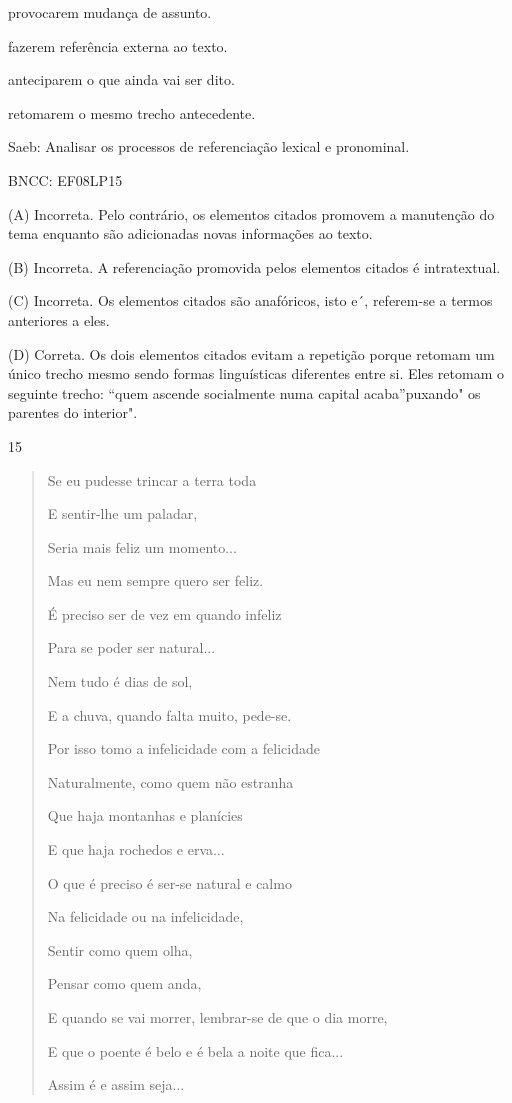 \begin{escolha}
\item provocarem mudança de assunto.

\item fazerem referência externa ao texto.

\item anteciparem o que ainda vai ser dito.

\item retomarem o mesmo trecho antecedente.
\end{escolha}

Saeb: Analisar os processos de referenciação lexical e pronominal.

BNCC: EF08LP15

(A) Incorreta. Pelo contrário, os elementos citados promovem a
manutenção do tema enquanto são adicionadas novas informações ao texto.

(B) Incorreta. A referenciação promovida pelos elementos citados é
intratextual.

(C) Incorreta. Os elementos citados são anafóricos, isto e´, referem-se
a termos anteriores a eles.

(D) Correta. Os dois elementos citados evitam a repetição porque retomam
um único trecho mesmo sendo formas linguísticas diferentes entre si.
Eles retomam o seguinte trecho: ``quem ascende socialmente numa capital
acaba''puxando" os parentes do interior".

\num{15}

\begin{quote}
Se eu pudesse trincar a terra toda

E sentir-lhe um paladar,

Seria mais feliz um momento...

Mas eu nem sempre quero ser feliz.

É preciso ser de vez em quando infeliz

Para se poder ser natural...

Nem tudo é dias de sol,

E a chuva, quando falta muito, pede-se.

Por isso tomo a infelicidade com a felicidade

Naturalmente, como quem não estranha

Que haja montanhas e planícies

E que haja rochedos e erva...

O que é preciso é ser-se natural e calmo

Na felicidade ou na infelicidade,

Sentir como quem olha,

Pensar como quem anda,

E quando se vai morrer, lembrar-se de que o dia morre,

E que o poente é belo e é bela a noite que fica...

Assim é e assim seja...
\end{quote}

